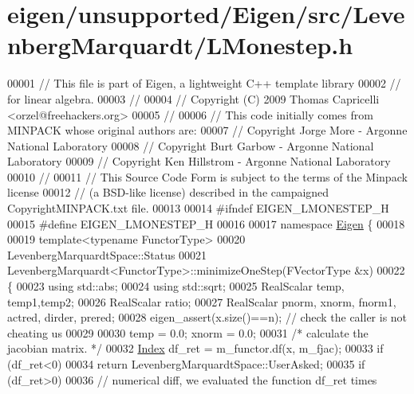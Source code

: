 \hypertarget{eigen_2unsupported_2_eigen_2src_2_levenberg_marquardt_2_l_monestep_8h_source}{}\section{eigen/unsupported/\+Eigen/src/\+Levenberg\+Marquardt/\+L\+Monestep.h}
\label{eigen_2unsupported_2_eigen_2src_2_levenberg_marquardt_2_l_monestep_8h_source}

\begin{DoxyCode}
00001 \textcolor{comment}{// This file is part of Eigen, a lightweight C++ template library}
00002 \textcolor{comment}{// for linear algebra.}
00003 \textcolor{comment}{//}
00004 \textcolor{comment}{// Copyright (C) 2009 Thomas Capricelli <orzel@freehackers.org>}
00005 \textcolor{comment}{//}
00006 \textcolor{comment}{// This code initially comes from MINPACK whose original authors are:}
00007 \textcolor{comment}{// Copyright Jorge More - Argonne National Laboratory}
00008 \textcolor{comment}{// Copyright Burt Garbow - Argonne National Laboratory}
00009 \textcolor{comment}{// Copyright Ken Hillstrom - Argonne National Laboratory}
00010 \textcolor{comment}{//}
00011 \textcolor{comment}{// This Source Code Form is subject to the terms of the Minpack license}
00012 \textcolor{comment}{// (a BSD-like license) described in the campaigned CopyrightMINPACK.txt file.}
00013 
00014 \textcolor{preprocessor}{#ifndef EIGEN\_LMONESTEP\_H}
00015 \textcolor{preprocessor}{#define EIGEN\_LMONESTEP\_H}
00016 
00017 \textcolor{keyword}{namespace }\hyperlink{namespace_eigen}{Eigen} \{
00018 
00019 \textcolor{keyword}{template}<\textcolor{keyword}{typename} FunctorType>
00020 LevenbergMarquardtSpace::Status
00021 LevenbergMarquardt<FunctorType>::minimizeOneStep(FVectorType  &x)
00022 \{
00023   \textcolor{keyword}{using} std::abs;
00024   \textcolor{keyword}{using} std::sqrt;
00025   RealScalar temp, temp1,temp2; 
00026   RealScalar ratio; 
00027   RealScalar pnorm, xnorm, fnorm1, actred, dirder, prered;
00028   eigen\_assert(x.size()==n); \textcolor{comment}{// check the caller is not cheating us}
00029 
00030   temp = 0.0; xnorm = 0.0;
00031   \textcolor{comment}{/* calculate the jacobian matrix. */}
00032   \hyperlink{namespace_eigen_a62e77e0933482dafde8fe197d9a2cfde}{Index} df\_ret = m\_functor.df(x, m\_fjac);
00033   \textcolor{keywordflow}{if} (df\_ret<0)
00034       \textcolor{keywordflow}{return} LevenbergMarquardtSpace::UserAsked;
00035   \textcolor{keywordflow}{if} (df\_ret>0)
00036       \textcolor{comment}{// numerical diff, we evaluated the function df\_ret times}

\end{DoxyCode}
